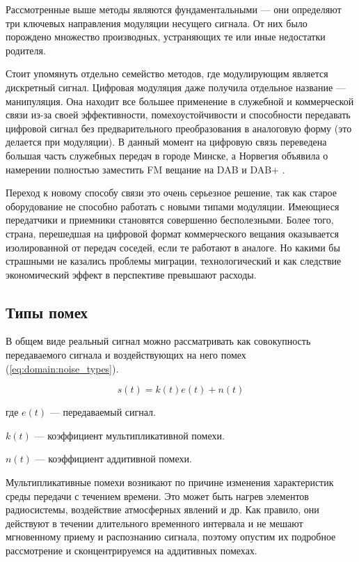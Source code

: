 Рассмотренные выше методы являются фундаментальными --- они определяют три ключевых направления модуляции несущего сигнала. От них было порождено множество производных, устраняющих те или иные недостатки родителя.

Стоит упомянуть отдельно семейство методов, где модулирующим является дискретный сигнал. Цифровая модуляция даже получила отдельное название --- манипуляция. Она находит все большее применение в служебной и коммерческой связи из-за своей эффективности, помехоустойчивости и способности передавать цифровой сигнал без предварительного преобразования в аналоговую форму (это делается при модуляции). В данный момент на цифровую связь переведена большая часть служебных передач в городе Минске, а Норвегия объявила о намерении полностью заместить FM вещание на DAB и DAB+ \cite{norway_dab}.

Переход к новому способу связи это очень серьезное решение, так как старое оборудование не способно работать с новыми типами модуляции. Имеющиеся передатчики и приемники становятся совершенно бесполезными. Более того, страна, перешедшая на цифровой формат коммерческого вещания оказывается изолированной от передач соседей, если те работают в аналоге. Но какими бы страшными не казались проблемы миграции, технологический и как следствие экономический эффект в перспективе превышают расходы.

\subsection{Типы помех}

В общем виде реальный сигнал можно рассматривать как совокупность передаваемого сигнала и воздействующих на него помех (\autoref{eq:domain:noise_types}). \cite{kolosov}

\begin{equation}
  \label{eq:domain:noise_types}
  s(t) = k(t) e(t) + n(t)
\end{equation}
\begin{explanation}
\item[где] $e(t)$ --- передаваемый сигнал.
\item $k(t)$ --- коэффициент мультипликативной помехи.
\item $n(t)$ --- коэффициент аддитивной помехи.
\end{explanation}

Мультипликативные помехи возникают по причине изменения характеристик среды передачи с течением времени. Это может быть нагрев элементов радиосистемы, воздействие атмосферных явлений и др. Как правило, они действуют в течении длительного временного интервала и не мешают мгновенному приему и распознанию сигнала, поэтому опустим их подробное рассмотрение и сконцентрируемся на аддитивных помехах.

